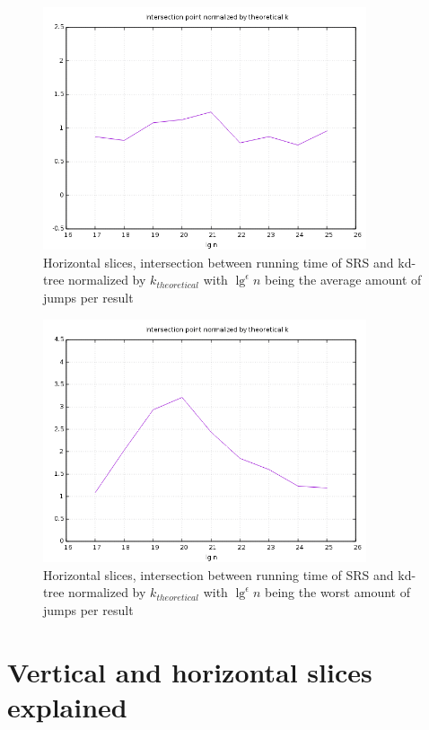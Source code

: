 \begin{figure}[h]
    \centering
    \includegraphics[width = 0.85\textwidth]{pictures/analysis/hori_theory.png}
    \caption{Horizontal slices, intersection between running time of SRS and kd-tree normalized by $k_{theoretical}$ with $\lg^\epsilon n$ being the average amount of jumps per result}\label{fig:hori_theory}
\end{figure}


\begin{figure}[h]
    \centering
    \includegraphics[width = 0.85\textwidth]{pictures/analysis/hori_theory_worst_jump.png}
    \caption{Horizontal slices, intersection between running time of SRS and kd-tree normalized by $k_{theoretical}$ with $\lg^\epsilon n$ being the worst amount of jumps per result}\label{fig:hori_theory_worst_jump}
\end{figure}
\clearpage

\section{Vertical and horizontal slices explained}

